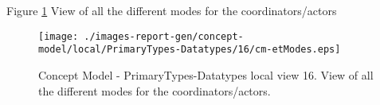 Figure \ref{fig:lu.uni.lassy.excalibur.group09.spec-CM-view-local-PrimaryTypes-Datatypes-16} View of all the different modes for the coordinators/actors



\begin{figure}[htbp] 
\label{fig:lu.uni.lassy.excalibur.group09.spec-CM}
\begin{center}
\texttt{[image: ./images-report-gen/concept-model/local/PrimaryTypes-Datatypes/16/cm-etModes.eps]}
\end{center}
\caption[Concept Model - PrimaryTypes-Datatypes local view 16 - View of all the different modes for ]{Concept Model - PrimaryTypes-Datatypes local view 16. View of all the different modes for the coordinators/actors.}
\label{fig:lu.uni.lassy.excalibur.group09.spec-CM-view-local-PrimaryTypes-Datatypes-16}
\end{figure}
\vspace{0.5cm} 
